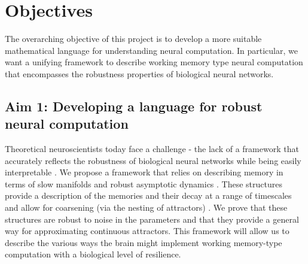 \documentclass[12pt,letterpaper, onecolumn]{article}
\theoremstyle{definition}
\theoremstyle{remark}
\begin{document}
%


\newpage
\section{Objectives}
The overarching objective of this project is to develop a more suitable mathematical language for understanding neural computation. In particular, we want a unifying framework to describe working memory type neural computation that encompasses the robustness properties of biological neural networks.

\subsection*{Aim 1: Developing a language for robust neural computation}
Theoretical neuroscientists today face a challenge - the lack of a  framework that accurately reflects the robustness of biological neural networks while being easily interpretable \citep{lillicrap2019}.
We propose a framework that relies on describing memory in terms of slow manifolds \citep{ghazizadeh2021slow} and robust asymptotic dynamics \citep{casey1996}.
These structures provide a description of the memories and their decay at a range of timescales \citep{jaeger2023timescales} and allow for coarsening (via the nesting of attractors) \citep{braun2010}.
We prove that these structures are robust to noise in the parameters \citep{Park2023a} and that they provide a general way for approximating continuous attractors.
This framework will allow us to describe the various ways the brain might implement working memory-type computation with a biological level of resilience.
\end{document}
